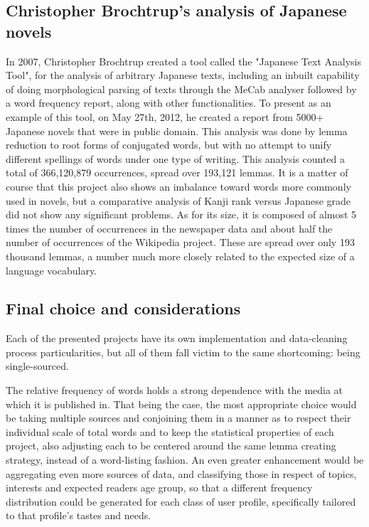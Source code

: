 \subsection{Christopher Brochtrup's analysis of Japanese novels}
In 2007, Christopher Brochtrup created a tool called the "Japanese Text Analysis Tool"\cite{christopher2007tool}, for the analysis of arbitrary Japanese texts, including an inbuilt capability of doing morphological parsing of texts through the MeCab\cite{kudo2005mecab} analyser followed by a word frequency report, along with other functionalities. To present as an example of this tool, on May 27th, 2012, he created a report from 5000+ Japanese novels that were in public domain\cite{christopher2007wordfreq}. This analysis was done by lemma reduction to root forms of conjugated words, but with no attempt to unify different spellings of words under one type of writing. This analysis counted a total of 366,120,879 occurrences, spread over 193,121 lemmas. It is a matter of course that this project also shows an imbalance toward words more commonly used in novels, but a comparative analysis of Kanji rank versus Japanese grade did not show any significant problems. As for its size, it is composed of almost 5 times the number of occurrences in the newspaper data and about half the number of occurrences of the Wikipedia project. These are spread over only 193 thousand lemmas, a number much more closely related to the expected size of a language vocabulary.

\subsection{Final choice and considerations}
Each of the presented projects have its own implementation and data-cleaning process particularities, but all of them fall victim to the same shortcoming: being single-sourced.

The relative frequency of words holds a strong dependence with the media at which it is published in. That being the case, the most appropriate choice would be taking multiple sources and conjoining them in a manner as to respect their individual scale of total words and to keep the statistical properties of each project, also adjusting each to be centered around the same lemma creating strategy, instead of a word-listing fashion. An even greater enhancement would be aggregating even more sources of data, and classifying those in respect of topics, interests and expected readers age group, so that a different frequency distribution could be generated for each class of user profile, specifically tailored to that profile's tastes and needs.

